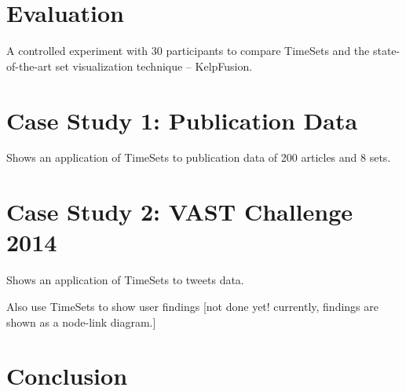\section{Evaluation}
A controlled experiment with 30 participants to compare TimeSets and the state-of-the-art set visualization technique -- KelpFusion.

\section{Case Study 1: Publication Data}
Shows an application of TimeSets to publication data of 200 articles and 8 sets.

\section{Case Study 2: VAST Challenge 2014}
Shows an application of TimeSets to tweets data. 

Also use TimeSets to show user findings [not done yet! currently, findings are shown as a node-link diagram.]

\section{Conclusion}

%
%
%
%
%
%